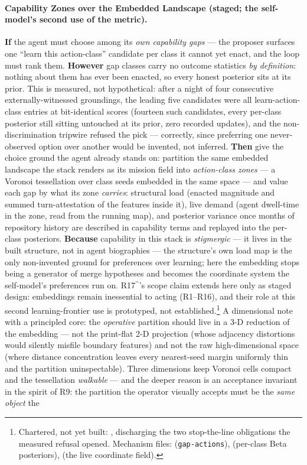 \paragraph{Capability Zones over the Embedded Landscape (staged; the self-model's second use of the metric).} \textbf{If} the agent must choose among its \emph{own capability gaps} --- the proposer surfaces one ``learn this action-class'' candidate per class it cannot yet enact, and the loop must rank them. \textbf{However} gap classes carry no outcome statistics \emph{by definition}: nothing about them has ever been enacted, so every honest posterior sits at its prior. This is measured, not hypothetical: after a night of four consecutive externally-witnessed groundings, the leading five candidates were all learn-action-class entries at bit-identical scores (fourteen such candidates, every per-class posterior still sitting untouched at its prior, zero recorded updates), and the non-discrimination tripwire refused the pick --- correctly, since preferring one never-observed option over another would be invented, not inferred. \textbf{Then} give the choice ground the agent already stands on: partition the same embedded landscape the stack renders as its mission field into \emph{action-class zones} --- a Voronoi tessellation over class seeds embedded in the same space --- and value each gap by what its zone \emph{carries}: structural load (enacted magnitude and summed turn-attestation of the features inside it), live demand (agent dwell-time in the zone, read from the running map), and posterior variance once months of repository history are described in capability terms and replayed into the per-class posteriors. \textbf{Because} capability in this stack is \emph{stigmergic} --- it lives in the built structure, not in agent biographies --- the structure's own load map is the only non-invented ground for preferences over learning; here the embedding stops being a generator of merge hypotheses and becomes the coordinate system the self-model's preferences run on. R17$^{\prime\prime}$'s scope claim extends here only as staged design: embeddings remain inessential to acting (R1--R16), and their role at this second learning-frontier use is prototyped, not established.\footnote{Chartered, not yet built: , discharging the two stop-the-line obligations the measured refusal opened. Mechanism files:  (\texttt{gap-actions}),  (per-class Beta posteriors),  (the live coordinate field).} A dimensional note with a principled core: the \emph{operative} partition should live in a 3-D reduction of the embedding --- not the print-flat 2-D projection (whose adjacency distortions would silently misfile boundary features) and not the raw high-dimensional space (where distance concentration leaves every nearest-seed margin uniformly thin and the partition uninspectable). Three dimensions keep Voronoi cells compact and the tessellation \emph{walkable} --- and the deeper reason is an acceptance invariant in the spirit of R9: the partition the operator visually accepts must be the \emph{same object} the 